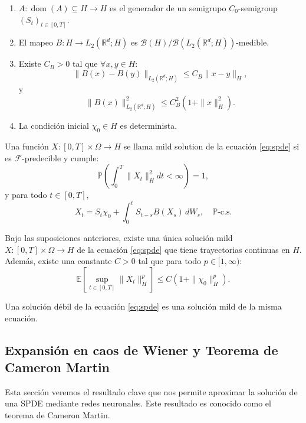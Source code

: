 \begin{enumerate}
  \item $A: \operatorname{dom}(A) \subseteq H \rightarrow H$ es el generador de un semigrupo $C_0$-semigroup $\left(S_t\right)_{t \in[0, T]}$.
  \item El mapeo $B: H \rightarrow L_2\left(\mathbb{R}^d ; H\right)$ es $\mathcal{B}(H)/ \mathcal{B}\left(L_2\left(\mathbb{R}^d ; H\right)\right)$-medible.
  \item Existe $C_B>0$ tal que $\forall x,y \in H$:
    \[
      \|B(x) - B(y)\|_{L_2(\mathbb{R}^d;H)} \leq C_{B} \|x - y\|_H,
    \]
    y
    \[
      \|B(x)\|_{L_2(\mathbb{R}^d;H)}^2 \leq C_{B}^2 (1 + \|x\|_H^2).
    \]
  \item La condición inicial $\chi_0 \in H$ es determinista.
\end{enumerate}

\begin{defn}
  Una función $X: [0,T] \times \Omega \to H$ se llama mild solution de la ecuación \eqref{eq:spde} si es $\mathcal{F}$-predecible y cumple:
  \[
    \mathbb{P}\left( \int_0^T \|X_t\|_H^2 dt < \infty \right) = 1,
  \]
  y para todo $t \in [0, T]$,
  \begin{equation}\label{eq:mild}
    X_t = S_t \chi_0 + \int_0^t S_{t-s} B(X_s) \, dW_s, \quad \mathbb{P}\text{-c.s.}
  \end{equation}
\end{defn}

\begin{teo}
  Bajo las suposiciones anteriores, existe una única solución mild $X: [0,T] \times \Omega \to H$ de la ecuación \eqref{eq:spde} que tiene trayectorias continuas en $H$. Además, existe una constante $C > 0$ tal que para todo $p \in [1,\infty)$:
  \[
    \mathbb{E}\left[ \sup_{t \in [0,T]} \|X_t\|_H^p \right] \leq C (1 + \|\chi_0\|_H^p).
  \]
\end{teo}

\begin{prop}[]
  Una solución débil de la ecuación \eqref{eq:spde} es una solución mild de la misma ecuación.
\end{prop}

\subsection{Expansión en caos de Wiener y Teorema de Cameron Martin}

Esta sección veremos el resultado clave que nos permite aproximar la solución de una SPDE mediante redes neuronales. Este resultado es conocido como el teorema de Cameron Martin.

